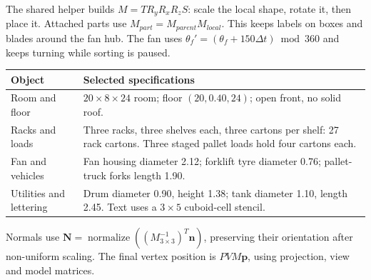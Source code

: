 The shared helper builds $M=T R_y R_x R_z S$: scale the local shape, rotate it, then place it. Attached parts use $M_{part}=M_{parent}M_{local}$. This keeps labels on boxes and blades around the fan hub. The fan uses $\theta_f'=(\theta_f+150\Delta t)\bmod360$ and keeps turning while sorting is paused.
\par{\small\begin{tabularx}{\textwidth}{@{}L{34mm}Y@{}}\toprule
\textbf{Object} & \textbf{Selected specifications}\\\midrule
Room and floor & $20\times8\times24$ room; floor $(20,0.40,24)$; open front, no solid roof.\\
Racks and loads & Three racks, three shelves each, three cartons per shelf: 27 rack cartons. Three staged pallet loads hold four cartons each.\\
Fan and vehicles & Fan housing diameter 2.12; forklift tyre diameter 0.76; pallet-truck forks length 1.90.\\
Utilities and lettering & Drum diameter 0.90, height 1.38; tank diameter 1.10, length 2.45. Text uses a $3\times5$ cuboid-cell stencil.\\\bottomrule
\end{tabularx}}\par
Normals use $\mathbf{N}=\operatorname{normalize}((M_{3\times3}^{-1})^T\mathbf{n})$, preserving their orientation after non-uniform scaling. The final vertex position is $PVM\mathbf{p}$, using projection, view and model matrices.
